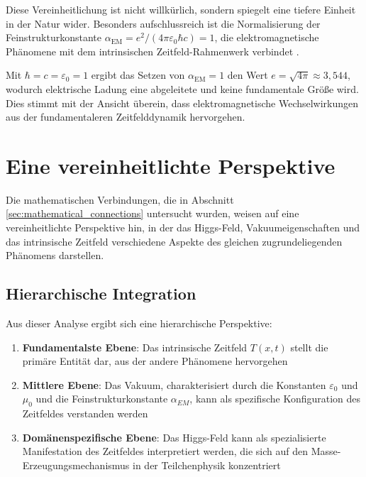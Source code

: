 \documentclass[12pt,a4paper]{article}
\newcommand{\Tfieldt}{T(x,t)}
\newcommand{\alphaEM}{\alpha_{\text{EM}}}
\begin{document}
	Diese Vereinheitlichung ist nicht willkürlich, sondern spiegelt eine tiefere Einheit in der Natur wider. Besonders aufschlussreich ist die Normalisierung der Feinstrukturkonstante $\alphaEM = e^2/(4\pi\varepsilon_0\hbar c) = 1$, die elektromagnetische Phänomene mit dem intrinsischen Zeitfeld-Rahmenwerk verbindet \cite{pascher_alpha_2025}.
	
	Mit $\hbar = c = \varepsilon_0 = 1$ ergibt das Setzen von $\alphaEM = 1$ den Wert $e = \sqrt{4\pi} \approx 3,544$, wodurch elektrische Ladung eine abgeleitete und keine fundamentale Größe wird. Dies stimmt mit der Ansicht überein, dass elektromagnetische Wechselwirkungen aus der fundamentaleren Zeitfelddynamik hervorgehen.
	
	\section{Eine vereinheitlichte Perspektive}
	\label{sec:unified_perspective}
	
	Die mathematischen Verbindungen, die in Abschnitt \ref{sec:mathematical_connections} untersucht wurden, weisen auf eine vereinheitlichte Perspektive hin, in der das Higgs-Feld, Vakuumeigenschaften und das intrinsische Zeitfeld verschiedene Aspekte des gleichen zugrundeliegenden Phänomens darstellen.
	
	\subsection{Hierarchische Integration}
	\label{subsec:hierarchical_integration}
	
	Aus dieser Analyse ergibt sich eine hierarchische Perspektive:
	
	\begin{enumerate}
		\item \textbf{Fundamentalste Ebene}: Das intrinsische Zeitfeld $\Tfieldt$ stellt die primäre Entität dar, aus der andere Phänomene hervorgehen
		
		\item \textbf{Mittlere Ebene}: Das Vakuum, charakterisiert durch die Konstanten $\varepsilon_0$ und $\mu_0$ und die Feinstrukturkonstante $\alpha_{EM}$, kann als spezifische Konfiguration des Zeitfeldes verstanden werden
		
		\item \textbf{Domänenspezifische Ebene}: Das Higgs-Feld kann als spezialisierte Manifestation des Zeitfeldes interpretiert werden, die sich auf den Masse-Erzeugungsmechanismus in der Teilchenphysik konzentriert
	\end{enumerate}
	
\end{document}
